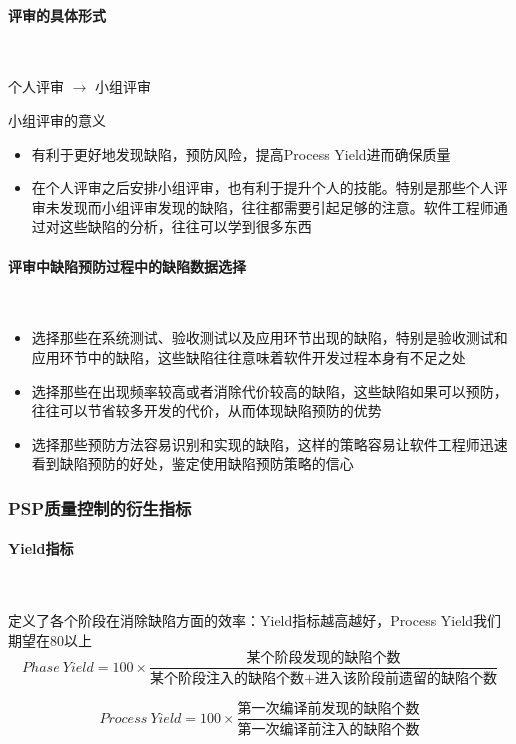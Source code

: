 \paragraph{评审的具体形式}~{} \par
个人评审 $\rightarrow$ 小组评审

小组评审的意义
\begin{itemize}
    \item 有利于更好地发现缺陷，预防风险，提高Process Yield进而确保质量
    \item 在个人评审之后安排小组评审，也有利于提升个人的技能。特别是那些个人评审未发现而小组评审发现的缺陷，往往都需要引起足够的注意。软件工程师通过对这些缺陷的分析，往往可以学到很多东西
\end{itemize}

\paragraph{评审中缺陷预防过程中的缺陷数据选择}~{} \par
\begin{itemize}
    \item 选择那些在系统测试、验收测试以及应用环节出现的缺陷，特别是验收测试和应用环节中的缺陷，这些缺陷往往意味着软件开发过程本身有不足之处
    \item 选择那些在出现频率较高或者消除代价较高的缺陷，这些缺陷如果可以预防，往往可以节省较多开发的代价，从而体现缺陷预防的优势
    \item 选择那些预防方法容易识别和实现的缺陷，这样的策略容易让软件工程师迅速看到缺陷预防的好处，鉴定使用缺陷预防策略的信心
\end{itemize}

\subsubsection{PSP质量控制的衍生指标}

\paragraph{Yield指标}~{} \par
定义了各个阶段在消除缺陷方面的效率：Yield指标越高越好，Process Yield我们期望在80以上
$$Phase\ Yield = 100 \times \frac{\mbox{某个阶段发现的缺陷个数}}{\mbox{某个阶段注入的缺陷个数} + \mbox{进入该阶段前遗留的缺陷个数}}$$

$$Process\ Yield = 100 \times \frac{\mbox{第一次编译前发现的缺陷个数}}{\mbox{第一次编译前注入的缺陷个数}}$$

